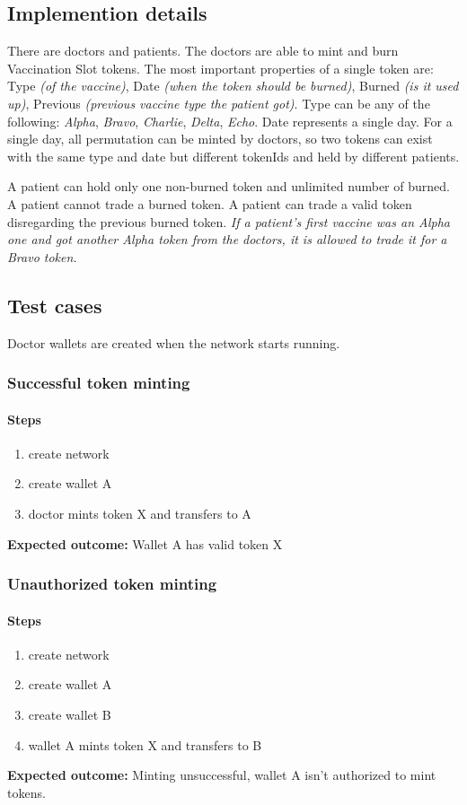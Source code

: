 \subsection{Implemention details}
There are doctors and patients. The doctors are able to mint and burn Vaccination Slot tokens. The most important properties of a single token are: Type \emph{(of the vaccine)}, Date \emph{(when the token should be burned)}, Burned \emph{(is it used up)}, Previous \emph{(previous vaccine type the patient got)}.
Type can be any of the following: \emph{Alpha}, \emph{Bravo}, \emph{Charlie}, \emph{Delta}, \emph{Echo}. Date represents a single day. For a single day, all permutation can be minted by doctors, so two tokens can exist with the same type and date but different tokenIds and held by different patients.

A patient can hold only one non-burned token and unlimited number of burned. A patient cannot trade a burned token.
A patient can trade a valid token disregarding the previous burned token. \emph{If a patient's first vaccine was an Alpha one and got another Alpha token from the doctors, it is allowed to trade it for a Bravo token.}


\newpage
\subsection{Test cases}
Doctor wallets are created when the network starts running.

\subsubsection{Successful token minting}
\paragraph*{Steps}
\begin{enumerate}
  \item create network
  \item create wallet A
  \item doctor mints token X and transfers to A
\end{enumerate}
\textbf{Expected outcome:} Wallet A has valid token X

\subsubsection{Unauthorized token minting}
\paragraph*{Steps}
\begin{enumerate}
  \item create network
  \item create wallet A
  \item create wallet B
  \item wallet A mints token X and transfers to B
\end{enumerate}
\textbf{Expected outcome:} Minting unsuccessful, wallet A isn't authorized to mint tokens.

